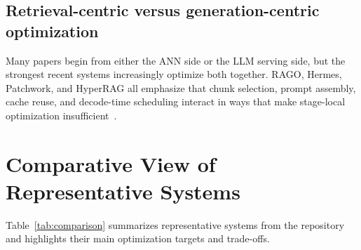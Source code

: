 \documentclass[acmsmall,screen]{acmart}
\begin{document}
\subsection{Retrieval-centric versus generation-centric optimization}

Many papers begin from either the ANN side or the LLM serving side, but the strongest recent systems increasingly optimize both together. RAGO, Hermes, Patchwork, and HyperRAG all emphasize that chunk selection, prompt assembly, cache reuse, and decode-time scheduling interact in ways that make stage-local optimization insufficient~\cite{rago2025,hermes2025,patchwork2025,hyperrag2025}.

\section{Comparative View of Representative Systems}

Table~\ref{tab:comparison} summarizes representative systems from the repository and highlights their main optimization targets and trade-offs.
\end{document}
